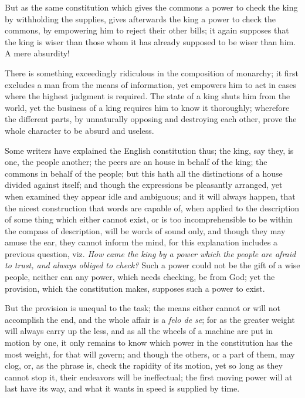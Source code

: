 \documentclass[12pt, twocolumn]{book}
\begin{document}
    \bigskip

    But as the same constitution which gives the commons a power to check the king by withholding the supplies, gives afterwards the king a power to check the commons, by empowering him to reject their other bills; it again supposes that the king is wiser than those whom it has already supposed to be wiser than him. A mere absurdity!

    There is something exceedingly ridiculous in the composition of monarchy; it first excludes a man from the means of information, yet empowers him to act in cases where the highest judgment is required. The state of a king shuts him from the world, yet the business of a king requires him to know it thoroughly; wherefore the different parts, by unnaturally opposing and destroying each other, prove the whole character to be absurd and useless.

    Some writers have explained the English constitution thus; the king, say they, is one, the people another; the peers are an house in behalf of the king; the commons in behalf of the people; but this hath all the distinctions of a house divided against itself; and though the expressions be pleasantly arranged, yet when examined they appear idle and ambiguous; and it will always happen, that the nicest construction that words are capable of, when applied to the description of some thing which either cannot exist, or is too incomprehensible to be within the compass of description, will be words of sound only, and though they may amuse the ear, they cannot inform the mind, for this explanation includes a previous question, viz. \textit{How came the king by a power which the people are afraid to trust, and always obliged to check?} Such a power could not be the gift of a wise people, neither can any power, which needs checking, be from God; yet the provision, which the constitution makes, supposes such a power to exist.

    But the provision is unequal to the task; the means either cannot or will not accomplish the end, and the whole affair is a \textit{felo de se}; for as the greater weight will always carry up the less, and as all the wheels of a machine are put in motion by one, it only remains to know which power in the constitution has the most weight, for that will govern; and though the others, or a part of them, may clog, or, as the phrase is, check the rapidity of its motion, yet so long as they cannot stop it, their endeavors will be ineffectual; the first moving power will at last have its way, and what it wants in speed is supplied by time.
\end{document}

